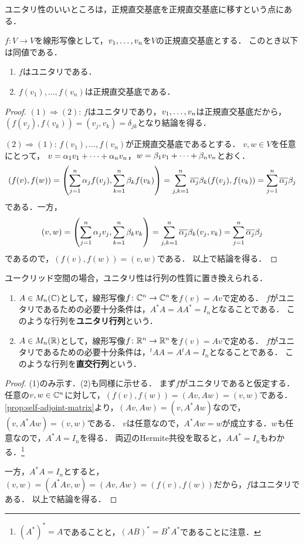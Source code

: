 ユニタリ性のいいところは，正規直交基底を正規直交基底に移すという点にある．
\begin{prop}
$f \colon V \to V$を線形写像として，$\idxdot{v}{1}{n}$を$V$の正規直交基底とする．
このとき以下は同値である．
\begin{enumerate}
  \item $f$はユニタリである．
  \item $f(v_1),\dots,f(v_n)$は正規直交基底である．
\end{enumerate}
\end{prop}
\begin{proof}
$(1) \Rightarrow (2)$:
$f$はユニタリであり，$\idxdot{v}{1}{n}$は正規直交基底だから，
$(f(v_j),f(v_k))=(v_j,v_k)=\delta_{jk}$となり結論を得る．

$(2) \Rightarrow (1)$:
$f(v_1),\dots,f(v_n)$が正規直交基底であるとする．
$v,w \in V$を任意にとって，
$v = \lncmb{\alpha}{v}{1}{n}{+}$，$w=\lncmb{\beta}{v}{1}{n}{+}$とおく．
\[
  (f(v),f(w)) = \left( \sum_{j=1}^n \alpha_j f(v_j), \sum_{k=1}^n \beta_k f(v_k) \right)
  = \sum_{j,k=1}^n \conj{\alpha_j} \beta_k (f(v_j),f(v_k))
  = \sum_{j=1}^n \conj{\alpha_j} \beta_j
\]
である．一方，
\[
  (v,w) = \left( \sum_{j=1}^n \alpha_j v_j, \sum_{k=1}^n \beta_k v_k \right)
  = \sum_{j,k=1}^n \conj{\alpha_j} \beta_k (v_j,v_k)
  = \sum_{j=1}^n \conj{\alpha_j} \beta_j
\]
であるので，$(f(v),f(w))=(v,w)$である．
以上で結論を得る．
\end{proof}
ユークリッド空間の場合，ユニタリ性は行列の性質に置き換えられる．
\begin{prop}
\begin{enumerate}
  \item $A \in M_n(\CC)$として，線形写像$f \colon \CC^n \to \CC^n$を$f(v)=Av$で定める．
  $f$がユニタリであるための必要十分条件は，$A^\ast A = A A^\ast = I_n$となることである．
  このような行列を\textbf{ユニタリ行列}という．
  \item $A \in M_n(\RR)$として，線形写像$f \colon \RR^n \to \RR^n$を$f(v)=Av$で定める．
  $f$がユニタリであるための必要十分条件は，${}^t A A = A {}^t A = I_n$となることである．
  このような行列を\textbf{直交行列}という．
\end{enumerate}
\end{prop}
\begin{proof}
(1)のみ示す．(2)も同様に示せる．
まず$f$がユニタリであると仮定する．
任意の$v,w \in \CC^n$に対して，$(f(v),f(w))=(Av,Aw)=(v,w)$である．
\cref{prop:self-adjoint-matrix}より，$(Av,Aw)=(v,A^\ast A w)$なので，$(v, A^\ast A w)=(v,w)$である．
$v$は任意なので，$A^\ast A w = w$が成立する．$w$も任意なので，$A^\ast A = I_n$を得る．
両辺のHermite共役を取ると，$A A^\ast = I_n$もわかる．\footnote{$(A^\ast)^\ast = A$であることと，$(AB)^\ast = B^\ast A^\ast$であることに注意．}

一方，$A^\ast A = I_n$とすると，$(v,w)=(A^\ast A v,w)=(Av,Aw)=(f(v),f(w))$だから，$f$はユニタリである．
以上で結論を得る．
\end{proof}

